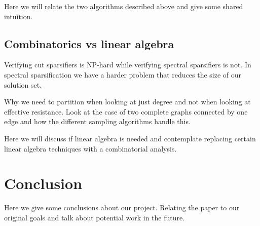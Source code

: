 \documentclass[12pt,twoside]{article}
\begin{document}



Here we will relate the two algorithms described above and give some shared intuition. 

\subsection{Combinatorics vs linear algebra}

Verifying cut sparsifiers is NP-hard while verifying spectral sparsifiers is not. In spectral sparsification we have a harder problem that reduces the size of our solution set. 

Why we need to partition when looking at just degree and not when looking at effective resistance. Look at the case of two complete graphs connected by one edge and how the different sampling algorithms handle this. 

Here we will discuss if linear algebra is needed and contemplate replacing certain linear algebra techniques with a combinatorial analysis.

\section{Conclusion}

Here we give some conclusions about our project. Relating the paper to our original goals and talk about potential work in the future. 



\end{document}
